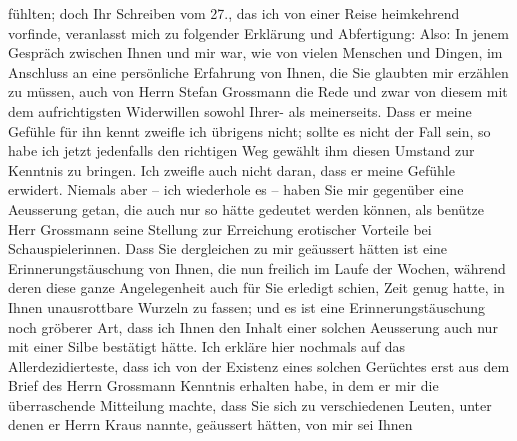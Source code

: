 \begin{ledgroupsized}[t]{13cm}
               fühlten; doch Ihr Schreiben vom 27., das ich von einer Reise heimkehrend
               vorfinde, veranlasst mich zu folgender Erklärung und Abfertigung:\pend
           \pstart
           Also: In jenem Gespräch zwischen Ihnen und mir war, wie von vielen Menschen und
               Dingen, im Anschluss an eine persönliche Erfahrung von Ihnen, die Sie glaubten mir
               erzählen zu müssen, auch von Herrn Stefan
                  Grossmann die Rede und zwar von diesem mit dem aufrichtigsten Widerwillen
               sowohl Ihrer- als meinerseits. Dass er meine Gefühle für ihn kennt zweifle ich
               übrigens nicht; sollte es nicht der Fall sein, so habe ich jetzt jedenfalls den
               richtigen {\pb}Weg gewählt ihm diesen Umstand zur Kenntnis zu
               bringen. Ich zweifle auch nicht daran, dass er meine Gefühle erwidert. Niemals aber –
               ich wiederhole es – haben Sie mir gegenüber eine Aeusserung getan, die auch nur so
               hätte gedeutet werden können, als benütze Herr Grossmann seine Stellung zur Erreichung erotischer Vorteile bei
               Schauspielerinnen. Dass Sie dergleichen zu mir geäussert hätten ist eine
               Erinnerungstäuschung von Ihnen, die nun freilich im Laufe der Wochen, während deren
               diese ganze Angelegenheit \introOben{}auch\introOben{} für Sie erledigt
               schien, Zeit genug hatte, in Ihnen unausrottbare Wurzeln zu fassen; und es ist eine
               Erinnerungstäuschung noch gröberer Art, dass ich Ihnen den Inhalt einer solchen
               Aeusserung auch nur mit einer Silbe bestätigt hätte. Ich erkläre hier nochmals auf
               das Allerdezidierteste, dass ich von der Existenz eines solchen Gerüchtes erst aus
               dem Brief des Herrn Grossmann Kenntnis
               erhalten habe, in dem er mir die überraschende Mitteilung machte, dass Sie sich zu
               verschiedenen Leuten, unter denen er Herrn Kraus nannte, geäussert hätten, von mir sei Ih{\pb}nen

\end{ledgroupsized}
